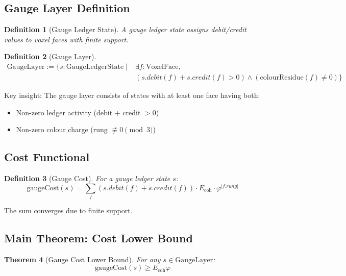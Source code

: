 \documentclass[11pt]{article}
\numberwithin{equation}{section}
\newtheorem{theorem}{Theorem}[section]
\newtheorem{definition}[theorem]{Definition}
\theoremstyle{remark}
\newcommand{\Ecoh}{E_{\text{coh}}}
\begin{document}
\subsection{Gauge Layer Definition}

\begin{definition}[Gauge Ledger State]
A gauge ledger state assigns debit/credit values to voxel faces with finite support.
\end{definition}

\begin{definition}[Gauge Layer]
\begin{align}
\text{GaugeLayer} := \{s : \text{GaugeLedgerState} \mid 
&\exists f : \text{VoxelFace},\\
&(s.debit(f) + s.credit(f) > 0) \wedge (\text{colourResidue}(f) \neq 0)\}
\end{align}
\end{definition}

Key insight: The gauge layer consists of states with at least one face having both:
\begin{itemize}
\item Non-zero ledger activity (debit + credit $> 0$)
\item Non-zero colour charge (rung $\not\equiv 0 \pmod{3}$)
\end{itemize}

\subsection{Cost Functional}

\begin{definition}[Gauge Cost]
For a gauge ledger state $s$:
\[\text{gaugeCost}(s) = \sum_f (s.debit(f) + s.credit(f)) \cdot \Ecoh \cdot \varphi^{|f.rung|}\]
\end{definition}

The sum converges due to finite support.

\subsection{Main Theorem: Cost Lower Bound}

\begin{theorem}[Gauge Cost Lower Bound]
For any $s \in \text{GaugeLayer}$:
\[\text{gaugeCost}(s) \geq \Ecoh \varphi\]
\end{theorem}
\end{document}
